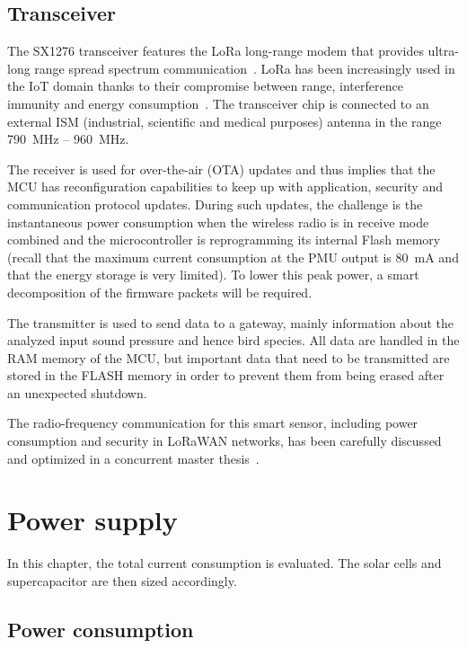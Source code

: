 \documentclass{EPL-master-thesis-covers-EN}
\begin{document}
\section{Transceiver}

The SX1276 transceiver features the LoRa long-range modem that provides ultra-long range spread spectrum communication~\cite{SX1276}. LoRa has been increasingly used in the IoT domain thanks to their compromise between range, interference immunity and energy consumption~\cite{SINHA201714}. The transceiver chip is connected to an external ISM (industrial, scientific and medical purposes) antenna in the range \SI{790}{MHz} -- \SI{960}{MHz}.

The receiver is used for over-the-air (OTA) updates and thus implies that the MCU has reconfiguration capabilities to keep up with application, security and communication protocol updates. During such updates, the challenge is the instantaneous power consumption when the wireless radio is in receive mode combined and the microcontroller is reprogramming its internal Flash memory (recall that the maximum current consumption at the PMU output is \SI{80}{mA} and that the energy storage is very limited). To lower this peak power, a smart decomposition of the firmware packets will be required.

The transmitter is used to send data to a gateway, mainly information about the analyzed input sound pressure and hence bird species. All data are handled in the RAM memory of the MCU, but important data that need to be transmitted are stored in the FLASH memory in order to prevent them from being erased after an unexpected shutdown.

The radio-frequency communication for this smart sensor, including power consumption and security in LoRaWAN networks, has been carefully discussed and optimized in a concurrent master thesis~\cite{Hess2020}.


\chapter{Power supply}

In this chapter, the total current consumption is evaluated. The solar cells and supercapacitor are then sized accordingly.

\section{Power consumption}
\label{section:power_consumption}
\end{document}
